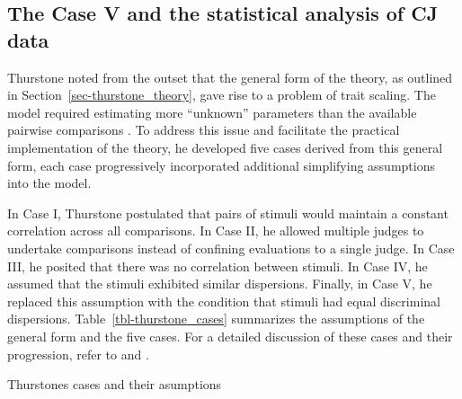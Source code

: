 \documentclass[
  authoryear,
  review,
  1p]{elsarticle}
\begin{document}
\subsection{The Case V and the statistical analysis of CJ
data}\label{sec-theory-issue1}

Thurstone noted from the outset that the general form of the theory, as
outlined in Section~\ref{sec-thurstone_theory}, gave rise to a problem
of trait scaling. The model required estimating more ``unknown''
parameters than the available pairwise comparisons
\citep[pp.~267]{Thurstone_1927b}. To address this issue and facilitate
the practical implementation of the theory, he developed five cases
derived from this general form, each case progressively incorporated
additional simplifying assumptions into the model.

In Case I, Thurstone postulated that pairs of stimuli would maintain a
constant correlation across all comparisons. In Case II, he allowed
multiple judges to undertake comparisons instead of confining
evaluations to a single judge. In Case III, he posited that there was no
correlation between stimuli. In Case IV, he assumed that the stimuli
exhibited similar dispersions. Finally, in Case V, he replaced this
assumption with the condition that stimuli had equal discriminal
dispersions. Table~\ref{tbl-thurstone_cases} summarizes the assumptions
of the general form and the five cases. For a detailed discussion of
these cases and their progression, refer to \citet{Thurstone_1927b} and
\citet[pp.~248--253]{Bramley_2008}.

\begin{table}

\caption{\label{tbl-thurstone_cases}Thurstones cases and their
asumptions}


\end{table}%
\end{document}
